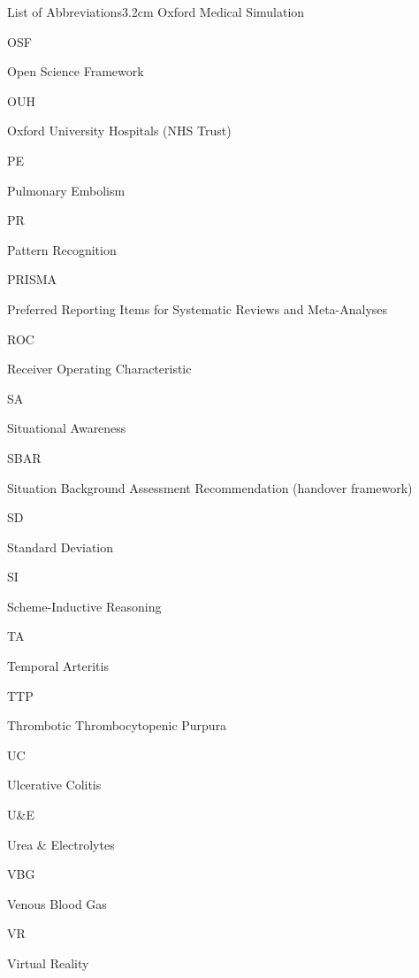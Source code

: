 \documentclass[a4paper, nobind]{templates/ociamthesis}
\begin{document}
\begin{romanpages}
\begin{mclistof}{List of Abbreviations}{3.2cm}
Oxford Medical Simulation

\item[OSF]

Open Science Framework

\item[OUH]

Oxford University Hospitals (NHS Trust)

\item[PE]

Pulmonary Embolism

\item[PR]

Pattern Recognition

\item[PRISMA]

Preferred Reporting Items for Systematic Reviews and Meta-Analyses

\item[ROC]

Receiver Operating Characteristic

\item[SA]

Situational Awareness

\item[SBAR]

Situation Background Assessment Recommendation (handover framework)

\item[SD]

Standard Deviation

\item[SI]

Scheme-Inductive Reasoning

\item[TA]

Temporal Arteritis

\item[TTP]

Thrombotic Thrombocytopenic Purpura

\item[UC]

Ulcerative Colitis

\item[U\&E]

Urea \& Electrolytes

\item[VBG]

Venous Blood Gas

\item[VR]

Virtual Reality

\end{mclistof} 


\end{romanpages}
\end{document}
